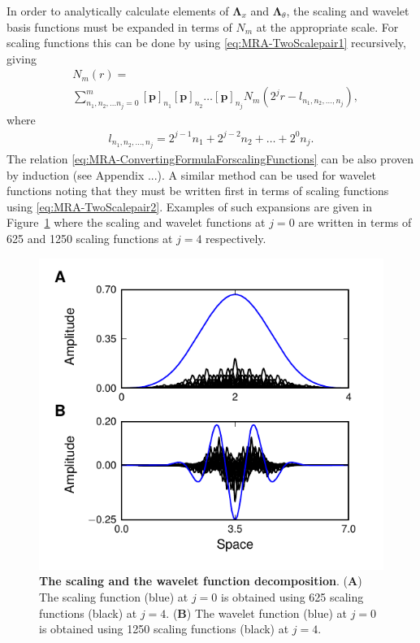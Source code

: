 \documentclass[11pt,draftcls,onecolumn,peerreview]{IEEEtran}
\begin{document}
In order to analytically calculate elements of $\boldsymbol\Lambda_{x}$ and $\boldsymbol\Lambda_{\theta}$, the scaling and wavelet basis functions must be expanded in terms of $N_m$ at the appropriate scale. For scaling functions this can be done  by using \eqref{eq:MRA-TwoScalepair1} recursively, giving
\begin{align}\label{eq:MRA-ConvertingFormulaForscalingFunctions}
 &N_m(r)=\nonumber \\
&\sum_{n_1,n_2, \dots n_j=0}^{m}\left[\mathbf p\right]_{n_1} \left[\mathbf p\right]_{n_2}\dots \left[\mathbf p\right]_{n_j}N_m(2^jr-l_{n_1,n_2, \dots, n_j}),
\end{align}
where 
\begin{align}
 l_{n_1,n_2, \dots, n_j}=2^{j-1}n_1+2^{j-2}n_2+ \dots +2^{0}n_j.
\end{align}
The relation \eqref{eq:MRA-ConvertingFormulaForscalingFunctions} can be also proven by induction (see Appendix ...). A similar method can be used for wavelet functions noting that they must be written first in terms of scaling functions using \eqref{eq:MRA-TwoScalepair2}. Examples of such expansions are given in Figure~\ref{fig:MRA-BasisDecomposition} where the scaling and wavelet functions at $j=0$ are written in terms of 625 and 1250 scaling functions at $j=4$ respectively.
\begin{figure}[!h] 
 	\centering
 		\includegraphics[scale=1]{./Graph/Decomposition.pdf}
 		\caption{{\bf The scaling and the wavelet function decomposition}. (\textbf{A}) The scaling function (blue) at $j=0$ is obtained using 625 scaling functions (black) at $j=4$. (\textbf{B}) The wavelet function (blue) at $j=0$ is obtained using 1250 scaling functions (black) at $j=4$.}
 	\label{fig:MRA-BasisDecomposition}
 \end{figure}  
\end{document}
